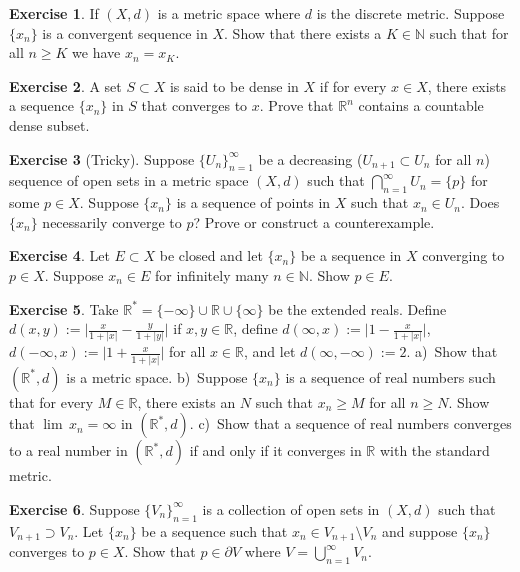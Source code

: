 \documentclass[12pt]{book}
\newcommand{\abs}[1]{\left\lvert {#1} \right\rvert}
\newcommand{\R}{{\mathbb{R}}}
\newcommand{\N}{{\mathbb{N}}}
\theoremstyle{plain}
\theoremstyle{remark}
\theoremstyle{definition}
\theoremstyle{exercise}
\newtheorem{exercise}{Exercise}[section]
\theoremstyle{example}
\begin{document}
\begin{exercise}
If $(X,d)$ is a metric space where $d$ is the discrete metric.  Suppose 
$\{ x_n \}$ is a convergent sequence in $X$.  Show that there exists
a $K \in \N$ such that for all $n \geq K$ we have $x_n = x_K$.
\end{exercise}

\begin{exercise}
A set $S \subset X$ is said to be dense in $X$ if for every $x \in X$,
there exists a sequence $\{ x_n \}$ in $S$ that converges to $x$.  Prove
that $\R^n$ contains a countable dense subset.
\end{exercise}

\begin{exercise}[Tricky]
Suppose $\{ U_n \}_{n=1}^\infty$ be a decreasing ($U_{n+1} \subset U_n$ for
all $n$) sequence of open sets in a metric space $(X,d)$ such that
$\bigcap_{n=1}^\infty U_n = \{ p \}$ for some $p \in X$.  Suppose 
$\{ x_n \}$ is a sequence of points in $X$ such that $x_n \in U_n$.  Does
$\{ x_n \}$ necessarily converge to $p$?  Prove or construct a counterexample.
\end{exercise}

\begin{exercise}
Let $E \subset X$ be closed and
let $\{ x_n \}$ be a sequence in $X$ converging to $p \in X$.  Suppose
$x_n \in E$ for infinitely many $n \in \N$.  Show $p \in E$.
\end{exercise}

\begin{exercise}
Take $\R^* = \{ -\infty \} \cup \R \cup \{ \infty \}$ be the extended reals.
Define $d(x,y) := \bigl\lvert \frac{x}{1+\abs{x}} - \frac{y}{1+\abs{y}}
\bigr\rvert$
if $x, y \in \R$,
define $d(\infty,x) := \bigl\lvert 1 - \frac{x}{1+\abs{x}} \bigr\rvert$,
$d(-\infty,x) := \bigl\lvert 1 + \frac{x}{1+\abs{x}} \bigr\rvert$
for all $x \in \R$, and
let $d(\infty,-\infty) := 2$.
a)~Show that $(\R^*,d)$ is a metric space.
b)~Suppose $\{ x_n \}$ is a sequence of real numbers such that
for every $M \in \R$, there exists an $N$ such that
$x_n \geq M$ for all $n \geq N$.  Show that $\lim\, x_n = \infty$ in
$(\R^*,d)$.
c)~Show that a sequence of real numbers converges to a real number
in $(\R^*,d)$ if and
only if it converges in $\R$ with the standard metric.
\end{exercise}

\begin{exercise}
Suppose $\{ V_n \}_{n=1}^\infty$ is a collection of open sets
in $(X,d)$
such that $V_{n+1} \supset V_n$.  Let $\{ x_n \}$ be a sequence
such that $x_n \in V_{n+1} \setminus V_n$ and suppose 
$\{ x_n \}$ converges to $p \in X$.  Show that $p \in \partial V$
where $V = \bigcup_{n=1}^\infty V_n$.
\end{exercise}
\end{document}
